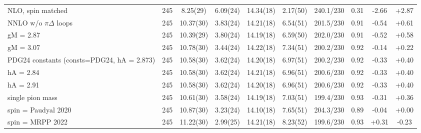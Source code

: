 \begin{tabular}{lccccccccc}
NLO, spin matched & 245 & 8.25(29) & 6.09(24) & 14.34(18) & 2.17(50) & 240.1/230 & 0.31 & -2.66 & +2.87 \\
NNLO w/o $\pi\Delta$ loops & 245 & 10.37(30) & 3.83(24) & 14.21(18) & 6.54(51) & 201.5/230 & 0.91 & -0.54 & +0.61 \\
gM = 2.87 & 245 & 10.39(29) & 3.80(24) & 14.19(18) & 6.59(50) & 202.0/230 & 0.91 & -0.52 & +0.58 \\
gM = 3.07 & 245 & 10.78(30) & 3.44(24) & 14.22(18) & 7.34(51) & 200.2/230 & 0.92 & -0.14 & +0.22 \\
PDG24 constants (consts=PDG24, hA = 2.873) & 245 & 10.58(30) & 3.62(24) & 14.20(18) & 6.97(51) & 200.2/230 & 0.92 & -0.33 & +0.40 \\
hA = 2.84 & 245 & 10.58(30) & 3.62(24) & 14.21(18) & 6.96(51) & 200.6/230 & 0.92 & -0.33 & +0.40 \\
hA = 2.91 & 245 & 10.58(30) & 3.62(24) & 14.20(18) & 6.96(51) & 200.6/230 & 0.92 & -0.33 & +0.40 \\
single pion mass & 245 & 10.61(30) & 3.58(24) & 14.19(18) & 7.03(51) & 199.4/230 & 0.93 & -0.31 & +0.36 \\
spin = Paudyal 2020 & 245 & 10.87(30) & 3.23(24) & 14.10(18) & 7.65(51) & 204.3/230 & 0.89 & -0.04 & +0.00 \\
spin = MRPP 2022 & 245 & 11.22(30) & 2.99(25) & 14.21(18) & 8.23(52) & 199.6/230 & 0.93 & +0.31 & -0.23 \\
\hline
\end{tabular}

